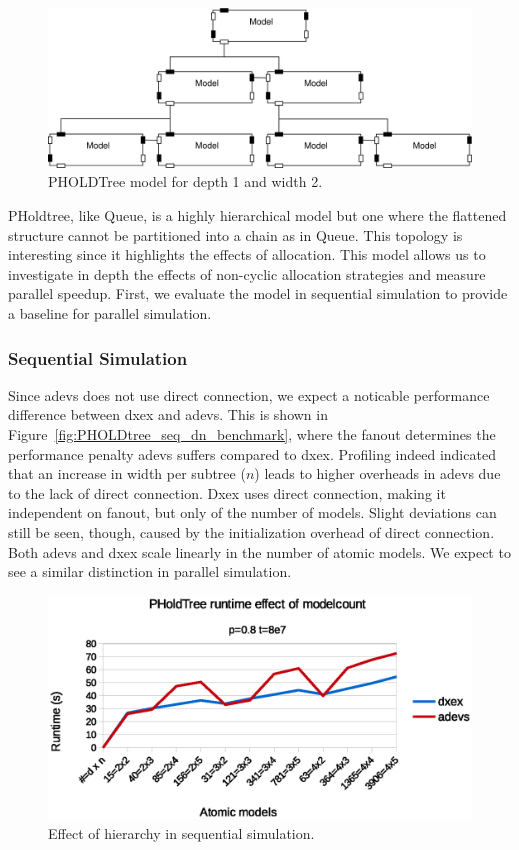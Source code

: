 \begin{figure}
    \center
    \includegraphics[width=\modelfraction\columnwidth]{fig/pholdtree.pdf}
    \caption{PHOLDTree model for depth 1 and width 2.}
    \label{fig:PHOLDTree_model}
\end{figure}

PHoldtree, like Queue, is a highly hierarchical model but one where the flattened structure cannot be partitioned into a chain as in Queue.
This topology is interesting since it highlights the effects of allocation.
This model allows us to investigate in depth the effects of non-cyclic allocation strategies and measure parallel speedup.
First, we evaluate the model in sequential simulation to provide a baseline for parallel simulation.

\subsubsection{Sequential Simulation}
Since adevs does not use direct connection, we expect a noticable performance difference between dxex and adevs.
This is shown in Figure~\ref{fig:PHOLDtree_seq_dn_benchmark}, where the fanout determines the performance penalty adevs suffers compared to dxex.
Profiling indeed indicated that an increase in width per subtree ($n$) leads to higher overheads in adevs due to the lack of direct connection.
Dxex uses direct connection, making it independent on fanout, but only of the number of models.
Slight deviations can still be seen, though, caused by the initialization overhead of direct connection.
Both adevs and dxex scale linearly in the number of atomic models.
We expect to see a similar distinction in parallel simulation.

\begin{figure}
    \center
    \includegraphics[width=\plotfraction\columnwidth]{fig/pholdtree_sequential_dn.eps}
    \caption{Effect of hierarchy in sequential simulation.}
    \label{fig:PHoldtree_seq_dn_benchmark}
\end{figure}

